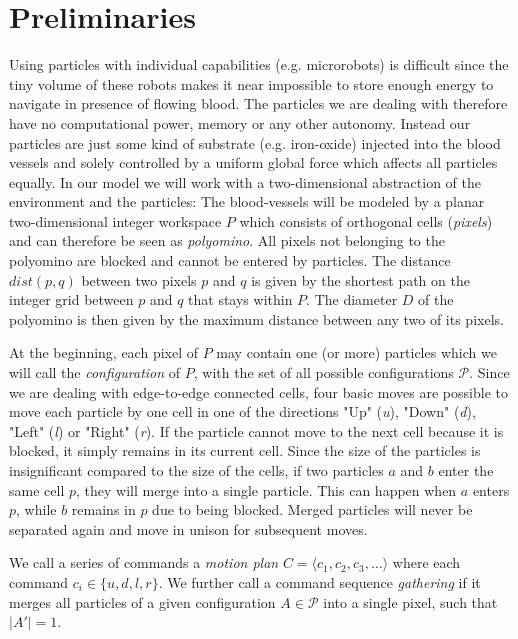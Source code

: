 \section{Preliminaries} \label{sec:TDDPreliminaries}
Using particles with individual capabilities (e.g. microrobots) is difficult since the tiny volume of these robots makes it near impossible to store enough energy to navigate in presence of flowing blood. The particles we are dealing with therefore have no computational power, memory or any other autonomy. Instead our particles are just some kind of substrate (e.g. iron-oxide) injected into the blood vessels and solely controlled by a uniform global force which affects all particles equally. In our model we will work with a two-dimensional abstraction of the environment and the particles: The blood-vessels will be modeled by a planar two-dimensional integer workspace $P$ which consists of orthogonal cells (\textit{pixels}) and can therefore be seen as \textit{polyomino}. All pixels not belonging to the polyomino are blocked and cannot be entered by particles. The distance $dist(p, q)$ between two pixels $p$ and $q$ is given by the shortest path on the integer grid between $p$ and $q$ that stays within $P$. The diameter $D$ of the polyomino is then given by the maximum distance between any two of its pixels. 

At the beginning, each pixel of $P$ may contain one (or more) particles which we will call the \textit{configuration} of $P$, with the set of all possible configurations $\mathcal{P}$. Since we are dealing with edge-to-edge connected cells, four basic moves are possible to move each particle by one cell in one of the directions "Up" (\textit{u}), "Down" (\textit{d}), "Left" (\textit{l}) or "Right" (\textit{r}). If the particle cannot move to the next cell because it is blocked, it simply remains in its current cell. Since the size of the particles is insignificant compared to the size of the cells, if two particles $a$ and $b$ enter the same cell $p$, they will merge into a single particle. This can happen when $a$ enters $p$, while $b$ remains in $p$ due to being blocked. Merged particles will never be separated again and move in unison for subsequent moves.

We call a series of commands a \textit{motion plan} $C = \langle c_1, c_2, c_3, \dots \rangle$ where each command $c_i \in \{u, d, l, r\}$. We further call a command sequence \textit{gathering} if it merges all particles of a given configuration $A \in \mathcal{P}$ into a single pixel, such that $|A'| = 1$.


